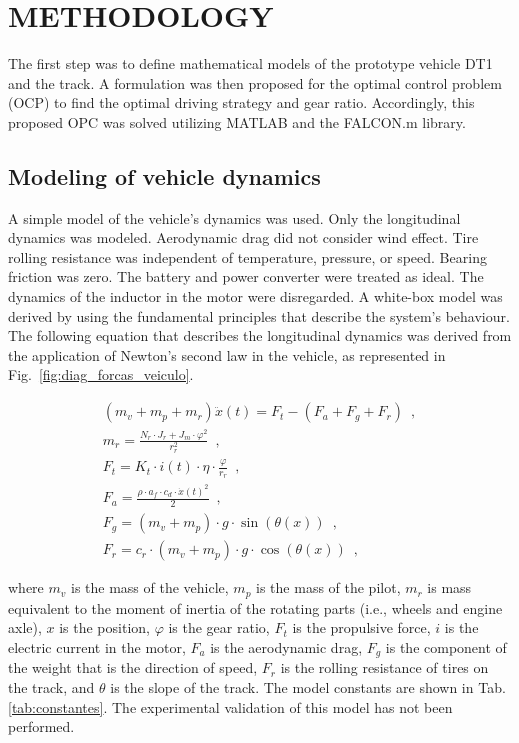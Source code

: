 \section{METHODOLOGY}

The first step was to define mathematical models of the prototype vehicle DT1 and the track. 
A formulation was then proposed for the optimal control problem (OCP) to find the optimal driving strategy and gear ratio. 
Accordingly, this proposed OPC was solved utilizing MATLAB and the FALCON.m library.

\subsection{Modeling of vehicle dynamics}

A simple model of the vehicle's dynamics was used. 
Only the longitudinal dynamics was modeled. Aerodynamic drag did not consider wind effect. 
Tire rolling resistance was independent of temperature, pressure, or speed. 
Bearing friction was zero. The battery and power converter were treated as ideal. 
The dynamics of the inductor in the motor were disregarded. 
A white-box model was derived by using the fundamental principles that describe the system's behaviour. 
The following equation that describes the longitudinal dynamics was derived from the application of Newton’s second law in the vehicle, as represented in Fig.~\ref{fig:diag_forcas_veiculo}. 

\begin{equation} \label{eq:modelo_1}
	\begin{split}
		\left( m_v + m_p + m_r \right) \ddot x(t) = F_t - (F_a + F_g + F_r) \enspace,\\ 
		m_r = \frac{N_r \cdot J_r + J_m\cdot \varphi^2 }{r_r^2} \enspace,\\ 
		F_{t} =  K_t \cdot i(t) \cdot \eta \cdot \frac{\varphi}{r_r} \enspace,\\
        F_{a} = \frac{\rho \cdot a_f \cdot c_d \cdot {\dot x(t)}^2}{2} \enspace,\\
        F_{g} = (m_v + m_p) \cdot g \cdot \sin(\theta(x)) \enspace,\\
        F_{r}  = c_{r} \cdot (m_v + m_p) \cdot g \cdot \cos(\theta(x)) \enspace,
	\end{split}
\end{equation}


\noindent where $m_v$ is the mass of the vehicle, $m_p$ is the mass of the pilot, $m_r$ is mass equivalent to the moment of inertia of the rotating parts 
(i.e., wheels and engine axle), $x$ is the position, $\varphi$ is the gear ratio, $F_{t}$ is the propulsive force, $i$ is the electric current in the motor, $F_{a}$ is the aerodynamic drag, $F_g$ is the component 
of the weight that is the direction of speed, $F_{r}$ is the rolling resistance of tires on the track, and $\theta$ is the slope of the track. The model constants are shown in Tab. \ref{tab:constantes}.
The experimental validation of this model has not been performed.

